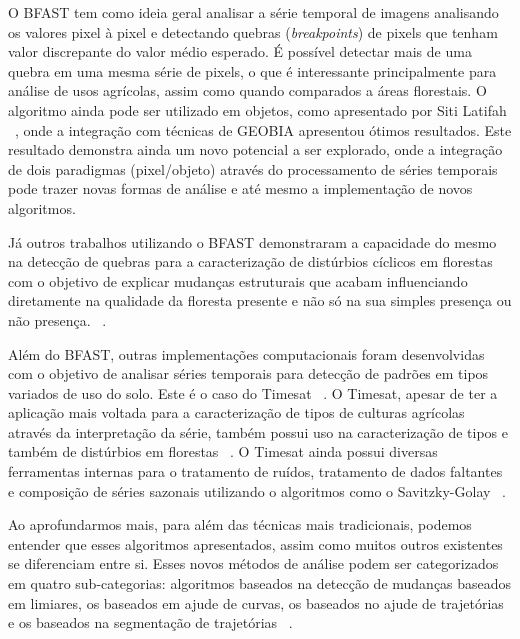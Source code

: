 \documentclass[twocolumn]{article}
\begin{document}
\par
O BFAST tem como ideia geral analisar a série temporal de imagens analisando os valores pixel à pixel e detectando quebras (\textit{breakpoints}) de pixels que tenham valor discrepante do valor médio esperado. É possível detectar mais de uma quebra em uma mesma série de pixels, o que é interessante principalmente para análise de usos agrícolas, assim como quando comparados a áreas florestais. O algoritmo ainda pode ser utilizado em objetos, como apresentado por Siti Latifah ~\cite{LATIFAH2016}, onde a integração com técnicas de GEOBIA apresentou ótimos resultados. Este resultado demonstra ainda um novo potencial a ser explorado, onde a integração de dois paradigmas (pixel/objeto) através do processamento de séries temporais pode trazer novas formas de análise e até mesmo a implementação de novos algoritmos.
\par
Já outros trabalhos utilizando o BFAST demonstraram a capacidade do mesmo na detecção de quebras para a caracterização de distúrbios cíclicos em florestas com o objetivo de explicar mudanças estruturais que acabam influenciando diretamente na qualidade da floresta presente e não só na sua simples presença ou não presença. ~\cite{JAKOVAC2017, DUTRIEUX2016112}.
\par
Além do BFAST, outras implementações computacionais foram desenvolvidas com o objetivo de analisar séries temporais para detecção de padrões em tipos variados de uso do solo. Este é o caso do Timesat ~\cite{Jnsson2004TIMESATA}. O Timesat, apesar de ter a aplicação mais voltada para a caracterização de tipos de culturas agrícolas através da interpretação da série, também possui uso na caracterização de tipos e também de distúrbios em florestas ~\cite{Wenbo2017}. O Timesat ainda possui diversas ferramentas internas para o tratamento de ruídos, tratamento de dados faltantes e composição de séries sazonais utilizando o algoritmos como o Savitzky-Golay ~\cite{Savitzky1964}.
\par
Ao aprofundarmos mais, para além das técnicas mais tradicionais, podemos entender que esses algoritmos apresentados, assim como muitos outros existentes se diferenciam entre si. Esses novos métodos de análise podem ser categorizados em quatro sub-categorias: algoritmos baseados na detecção de mudanças baseados em limiares, os baseados em ajude de curvas, os baseados no ajude de trajetórias e os baseados na segmentação de trajetórias ~\cite{Banskota2014, Hirschmugl2017}.
\end{document}
